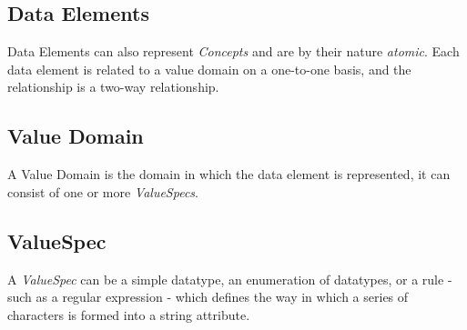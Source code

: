 \subsection{Data Elements} 
Data Elements can also represent \emph{Concepts} and are by their nature \emph{atomic}.  Each data element is related to a value domain on a one-to-one basis, and the relationship is a two-way relationship.
\subsection{Value Domain}
A Value Domain is the domain in which the data element is represented, it can consist of one or more \emph{ValueSpecs}.
\subsection{ValueSpec}
A \emph{ValueSpec} can be a simple datatype, an enumeration of datatypes, or a rule - such as a regular expression - which defines the way in which a series of characters is formed into a string attribute. 








 




